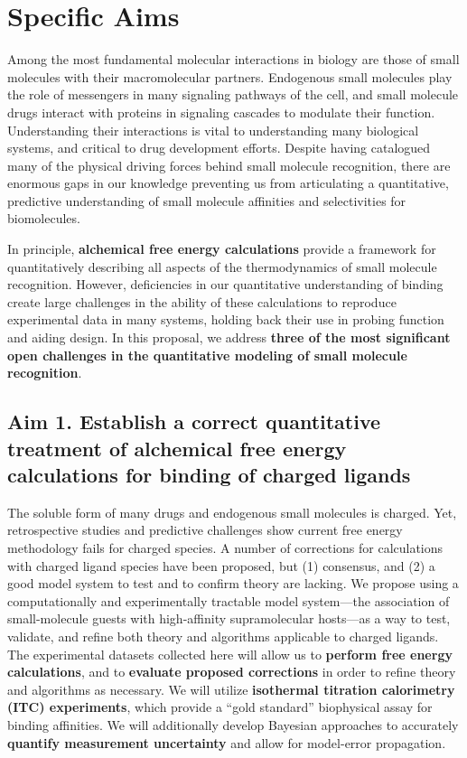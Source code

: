\documentclass[10pt]{article}
\date{}
\begin{document}
\section*{\centering Specific Aims}
Among the most fundamental molecular interactions in biology are those of small molecules with their macromolecular partners.
Endogenous small molecules play the role of messengers in many signaling pathways of the cell, and small molecule drugs interact with proteins in signaling cascades to modulate their function.
Understanding their interactions is vital to understanding many biological systems, and critical to drug development efforts.
Despite having catalogued many of the physical driving forces behind small molecule recognition, there are enormous gaps in our knowledge preventing us from articulating a quantitative, predictive understanding of small molecule affinities and selectivities for biomolecules.

In principle, \textbf{alchemical free energy calculations} provide a framework for quantitatively describing all aspects of the thermodynamics of small molecule recognition. However, deficiencies in our quantitative understanding of binding create large challenges in the ability of these calculations to reproduce experimental data in many systems, holding back their use in probing function and aiding design.
In this proposal, we address \textbf{three of the most significant open challenges in the quantitative modeling of small molecule recognition}.


\subsection*{Aim 1. Establish a correct quantitative treatment of alchemical free energy calculations for binding of charged ligands}
The soluble form of many drugs and endogenous small molecules is charged.
Yet, retrospective studies and predictive challenges show current free energy methodology fails for charged species\cite{Rocklin2013b,Muddana2014a}.
A number of corrections for calculations with charged ligand species have been proposed, but (1) consensus, and (2) a good model system to test and to confirm theory are lacking.
We propose using a computationally and experimentally tractable model system---the association of small-molecule guests with high-affinity supramolecular hosts---as a way to test, validate, and refine both theory and algorithms applicable to charged ligands.
The experimental datasets collected here will allow us to \textbf{ perform free energy calculations}, and to \textbf{ evaluate proposed corrections} in order to refine theory and algorithms as necessary.
We will utilize \textbf{ isothermal titration calorimetry (ITC) experiments}, which provide a “gold standard” biophysical assay for binding affinities.
We will additionally develop Bayesian approaches to accurately \textbf{ quantify measurement uncertainty} and allow for model-error propagation.
\end{document}
